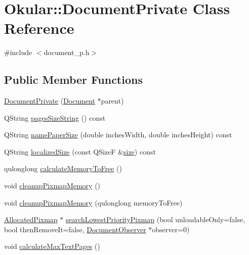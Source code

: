 \hypertarget{classOkular_1_1DocumentPrivate}{\section{Okular\+:\+:Document\+Private Class Reference}
\label{classOkular_1_1DocumentPrivate}
}


{\ttfamily \#include $<$document\+\_\+p.\+h$>$}

\subsection*{Public Member Functions}
\begin{DoxyCompactItemize}
\item 
\hyperlink{classOkular_1_1DocumentPrivate_a9f399fffd653d65dcea8aebeab4b3f19}{Document\+Private} (\hyperlink{classOkular_1_1Document}{Document} $\ast$parent)
\item 
Q\+String \hyperlink{classOkular_1_1DocumentPrivate_af0885d765ba194642c64d56de66fc96c}{pages\+Size\+String} () const 
\item 
Q\+String \hyperlink{classOkular_1_1DocumentPrivate_ad714bf38c42e467d71a93494957e1cf8}{name\+Paper\+Size} (double inches\+Width, double inches\+Height) const 
\item 
Q\+String \hyperlink{classOkular_1_1DocumentPrivate_a7cac2460a84aaba0b164f8e757df381a}{localized\+Size} (const Q\+Size\+F \&\hyperlink{synctex__parser_8c_aa23c661441688350614bd6a350d2b6ff}{size}) const 
\item 
qulonglong \hyperlink{classOkular_1_1DocumentPrivate_a91e5e2e26f829b1a08ab01c17fdecc2e}{calculate\+Memory\+To\+Free} ()
\item 
void \hyperlink{classOkular_1_1DocumentPrivate_a8490b106f8f873de76b7ca6dcb1320f0}{cleanup\+Pixmap\+Memory} ()
\item 
void \hyperlink{classOkular_1_1DocumentPrivate_af5fffaf34fc68cdec3eb850ad54c0c62}{cleanup\+Pixmap\+Memory} (qulonglong memory\+To\+Free)
\item 
\hyperlink{structAllocatedPixmap}{Allocated\+Pixmap} $\ast$ \hyperlink{classOkular_1_1DocumentPrivate_a751cdd88fe8ba456a89f6c998a9ae35a}{search\+Lowest\+Priority\+Pixmap} (bool unloadable\+Only=false, bool then\+Remove\+It=false, \hyperlink{classOkular_1_1DocumentObserver}{Document\+Observer} $\ast$observer=0)
\item 
void \hyperlink{classOkular_1_1DocumentPrivate_ac6235abfccf3d0211060caf1d735adca}{calculate\+Max\+Text\+Pages} ()

\end{DoxyCompactItemize}
